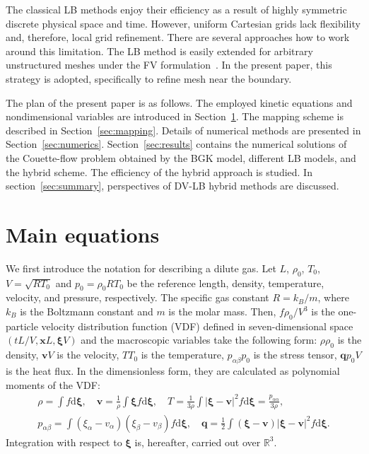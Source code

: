 \documentclass[]{elsarticle} %
\newcommand{\dd}{\mathrm{d}}
\newcommand{\dxi}{\dd{\boldsymbol{\xi}}}
\newcommand{\bxi}{\boldsymbol{\xi}}
\newcommand{\bv}{\boldsymbol{v}}
\newcommand{\bq}{\boldsymbol{q}}
\newcommand{\bx}{\boldsymbol{x}}
\newcommand{\refer}[1]{#1_0}
\begin{document}
The classical LB methods enjoy their efficiency as a result of highly symmetric discrete physical space and time.
However, uniform Cartesian grids lack flexibility and, therefore, local grid refinement.
There are several approaches how to work around this limitation.
The LB method is easily extended for arbitrary unstructured meshes
under the FV formulation~\cite{Succi1992, Peng1999, Patil2009, Li2016}.
In the present paper, this strategy is adopted, specifically to refine mesh near the boundary.

The plan of the present paper is as follows.
The employed kinetic equations and nondimensional variables are introduced in Section~\ref{sec:equations}.
The mapping scheme is described in Section~\ref{sec:mapping}.
Details of numerical methods are presented in Section~\ref{sec:numerics}.
Section~\ref{sec:results} contains the numerical solutions of the Couette-flow problem
obtained by the BGK model, different LB models, and the hybrid scheme.
The efficiency of the hybrid approach is studied.
In section~\ref{sec:summary}, perspectives of DV-LB hybrid methods are discussed.

\section{Main equations}\label{sec:equations}

We first introduce the notation for describing a dilute gas.
Let \(L\), \(\refer\rho\), \(\refer{T}\), \(V = \sqrt{R\refer{T}}\) and \(\refer{p} = \refer{\rho}R\refer{T}\) be
the reference length, density, temperature, velocity, and pressure, respectively.
The specific gas constant \(R = k_B/m\), where \(k_B\) is the Boltzmann constant and \(m\) is the molar mass.
Then, \(f\refer{\rho}/V^3\) is the one-particle velocity distribution function (VDF)
defined in seven-dimensional space \((tL/V, \bx L, \bxi V)\) and
the macroscopic variables take the following form:
\(\rho\refer{\rho}\) is the density, \(\bv V\) is the velocity, \(T\refer{T}\) is the temperature,
\(p_{\alpha\beta}\refer{p}\) is the stress tensor, \(\bq\refer{p}V\) is the heat flux.
In the dimensionless form, they are calculated as polynomial moments of the VDF:
\begin{equation}\label{eq:macro}
    \begin{gathered}
    \rho = \int f \dxi, \quad
    \bv = \frac1{\rho} \int \bxi f \dxi, \quad
    T = \frac{1}{3\rho}\int|\bxi-\bv|^2f \dxi = \frac{p_{\alpha\alpha}}{3\rho}, \\
    p_{\alpha\beta} = \int(\xi_{\alpha}-v_{\alpha})(\xi_{\beta}-v_{\beta}) f \dxi, \quad
    \bq = \frac12\int(\bxi-\bv)|\bxi-\bv|^2 f \dxi.
    \end{gathered}
\end{equation}
Integration with respect to \(\bxi\) is, hereafter, carried out over \(\mathbb{R}^3\).
\end{document}
